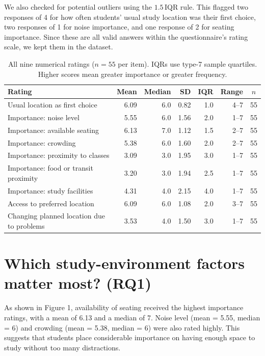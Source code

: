 \documentclass[11pt,letterpaper]{article}
\begin{document}
We also checked for potential outliers using the $1.5\,\mathrm{IQR}$ rule. This flagged two responses of 4 for how often students' usual study location was their first choice, two responses of 1 for noise importance, and one response of 2 for seating importance. Since these are all valid answers within the questionnaire's rating scale, we kept them in the dataset.

\begin{table}[H]\centering\small
\label{tab:summary}
\begin{tabular}{@{}p{7.1cm}rrrrrc@{}}\toprule
Rating & Mean & Median & SD & IQR & Range & $n$\\\midrule
Usual location as first choice & 6.09 & 6.0 & 0.82 & 1.0 & 4--7 & 55\\
Importance: noise level & 5.55 & 6.0 & 1.56 & 2.0 & 1--7 & 55\\
Importance: available seating & 6.13 & 7.0 & 1.12 & 1.5 & 2--7 & 55\\
Importance: crowding & 5.38 & 6.0 & 1.60 & 2.0 & 2--7 & 55\\
Importance: proximity to classes & 3.09 & 3.0 & 1.95 & 3.0 & 1--7 & 55\\
Importance: food or transit proximity & 3.20 & 3.0 & 1.94 & 2.5 & 1--7 & 55\\
Importance: study facilities & 4.31 & 4.0 & 2.15 & 4.0 & 1--7 & 55\\
Access to preferred location & 6.09 & 6.0 & 1.08 & 2.0 & 3--7 & 55\\
Changing planned location due to problems & 3.53 & 4.0 & 1.50 & 3.0 & 1--7 & 55\\
\bottomrule\end{tabular}
\caption{All nine numerical ratings ($n=55$ per item). IQRs use type-7 sample quartiles. \\ Higher scores mean greater importance or greater frequency.}\end{table}

\section{Which study-environment factors matter most? (RQ1)}
As shown in Figure 1, availability of seating received the highest importance ratings, with a mean of 6.13 and a median of 7. Noise level (mean = 5.55, median = 6) and crowding (mean = 5.38, median = 6) were also rated highly. This suggests that students place considerable importance on having enough space to study without too many distractions.
\end{document}

